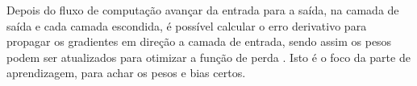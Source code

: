 Depois do fluxo de computação avançar da entrada para a saída, na camada de saída e cada camada escondida, é possível calcular o erro derivativo para propagar os gradientes em direção a camada de entrada, sendo assim os pesos podem ser atualizados para otimizar a função de perda \cite{li2017deep}. Isto é o foco da parte de aprendizagem, para achar os pesos e bias certos.





